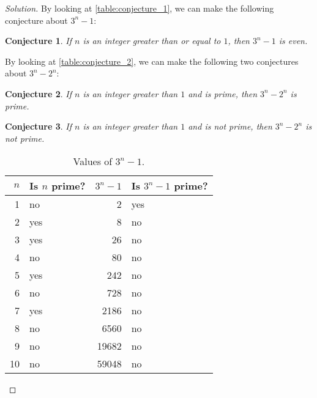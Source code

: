 \documentclass[headings=standardclasses]{scrartcl}
\newtheorem*{conjecture}{Conjecture}
\theoremstyle{definition}
\newenvironment{solution}{\begin{proof}[Solution]}{\end{proof}}
\begin{document}
\begin{solution}
  By looking at \autoref{table:conjecture_1}, we can make the following
  conjecture about \(3^n - 1\):

  \begin{conjecture}
    If \(n\) is an integer greater than or equal to \(1\), then \(3^n - 1\) is
    even.
  \end{conjecture}

  By looking at \autoref{table:conjecture_2}, we can make the following two
  conjectures about \(3^n - 2^n\):

  \begin{conjecture}
    If \(n\) is an integer greater than \(1\) and is prime, then \(3^n - 2^n\)
    is prime.
  \end{conjecture}

  \begin{conjecture}
    If \(n\) is an integer greater than \(1\) and is not prime, then \(3^n -
    2^n\) is not prime. \qedhere
  \end{conjecture}

  \begin{table}[H]
    \centering
    \begin{tabular}{rlrl}
      \toprule
      \(n\) & Is \(n\) prime? & \(3^n - 1\) & Is \(3^n - 1\) prime? \\
      \midrule
      1 & no & 2 & yes \\
      2 & yes & 8 & no \\
      3 & yes & 26 & no \\
      4 & no & 80 & no \\
      5 & yes & 242 & no \\
      6 & no & 728 & no \\
      7 & yes & 2186 & no \\
      8 & no & 6560 & no \\
      9 & no & 19682 & no \\
      10 & no & 59048 & no \\
      \bottomrule
    \end{tabular}
    \caption{Values of \(3^n - 1\).}\label{table:conjecture_1}
  \end{table}


\end{solution}
\end{document}
